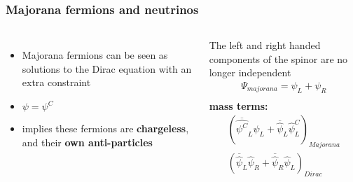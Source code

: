 \documentclass{beamer}
\begin{document}
	\begin{frame}
		\frametitle{Majorana fermions and neutrinos}
		\begin{columns}[c] %
			
			\begin{itemize}
			\item Majorana fermions can be seen as solutions to the Dirac equation with an extra constraint
			\item $\psi = \psi^C$
			\item implies these fermions are \textbf{chargeless}, and their \textbf{own anti-particles}
			\end{itemize}
			
			{\footnotesize The left and right handed components of the spinor are no longer independent}
			\begin{eqnarray*}
			\Psi_{majorana} = \psi_L + \psi_R \\
			\end{eqnarray*}
			{\footnotesize \textbf{mass terms:}}
			\begin{eqnarray*}
			\left( \overline{\hat{\psi^C}}_L \hat{\psi}_L + \overline{\hat{\psi}}_L \hat{\psi}^C_L \right)_{Majorana} \\
			 \left(\overline{\hat{\psi}}_L \hat{\psi}_R + \overline{\hat{\psi}}_R \hat{\psi}_L\right)_{Dirac}
			\end{eqnarray*}
			
		\end{columns}
	\end{frame}	
	
\end{document}
